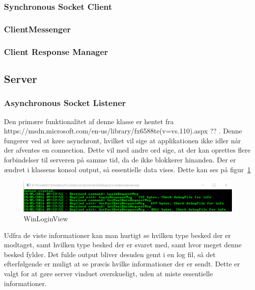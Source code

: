 \subsubsection{Synchronous Socket Client}

\subsubsection{ClientMessenger}

\subsubsection{Client Response Manager}

\subsection{Server}

\subsubsection{Asynchronous Socket Listener}
Den primære funktionalitet af denne klasse er hentet fra https://msdn.microsoft.com/en-us/library/fx6588te(v=vs.110).aspx ?? . Denne fungerer ved at køre asynchront, hvilket vil sige at applikationen ikke idler når der afventes en connection. Dette vil med andre ord sige, at der kan oprettes flere forbindelser til serveren på samme tid, da de ikke blokkerer hinanden.
Der er ændret i klassens konsol output, så essentielle data vises. Dette kan ses på figur~\ref{fig:asynchronousSocketListener}

\begin{figure}
	\centering
	\includegraphics[width=0.9\linewidth]{figs/connection/asynchronousSocketListener.png}
	\caption{WinLoginView}
	\label{fig:asynchronousSocketListener}
\end{figure}

Udfra de viste informationer kan man hurtigt se hvilken type besked der er modtaget, samt hvilken type besked der er svaret med, samt hvor meget denne besked fylder. Det fulde output bliver desuden gemt i en log fil, så det efterfølgende er muligt at se præcis hvilke informationer der er sendt. Dette er valgt for at gøre server vinduet overskueligt, uden at miste essentielle informationer.

